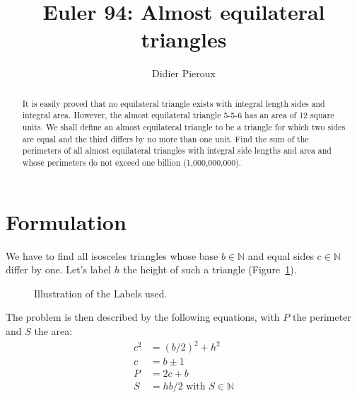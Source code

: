 \documentclass[11pt, twoside, a4paper]{article}
\theoremstyle{definition}
\newcommand{\Fig}[1]{Figure~\ref{fig:#1}}
\newcommand{\set}[1]{\mathbb{#1}}
\begin{document}
\title{Euler 94: Almost equilateral triangles}
\date{}
\author{Didier Pieroux}
\maketitle

\begin{abstract} 

It is easily proved that no equilateral triangle exists with integral length sides and integral area. However, the almost equilateral triangle 5-5-6 has an area of 12 square units. We shall define an almost equilateral triangle to be a triangle for which two sides are equal and the third differs by no more than one unit. Find the sum of the perimeters of all almost equilateral triangles with integral side lengths and area and whose perimeters do not exceed one billion (1,000,000,000).
\end{abstract}

\section{Formulation}

We have to find all isosceles triangles whose base $b\in\set N$ and equal sides $c \in\set N$ differ by one. Let's label $h$ the height of such a triangle (\Fig{triangle1}).
\begin{figure}[h]
    \begin{center}
        \caption{Illustration of the Labels used.}
        \label{fig:triangle1}
    \end{center}
\end{figure}

The problem is then described by the following equations, with $P$ the perimeter and $S$ the area:
\begin{align}
    c^2 & = (b/2)^2 + h^2 \label{eq:pytha1} \\ 
    c & = b \pm 1 \label{eq:ab} \\ 
    P & = 2c+b \\ 
    S & = h b/2 \text{ with } S \in\set N \label{eq:S1}
\end{align} 
    
\end{document}
